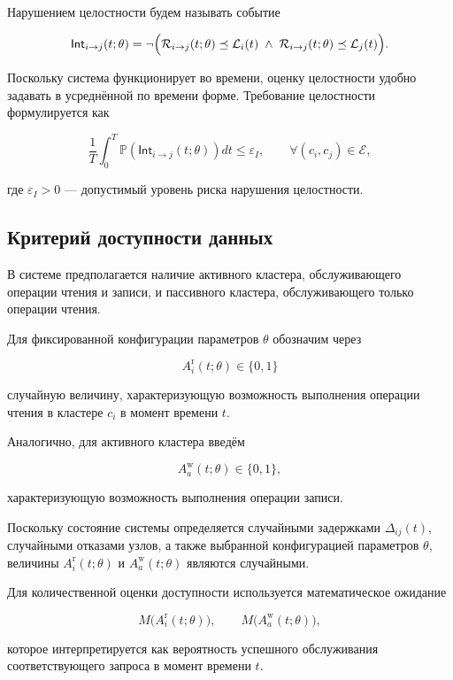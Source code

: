 Нарушением целостности будем называть событие

\[
\mathsf{Int}_{i\to j}(t;\theta)
=
\neg\Bigl(
\mathcal{R}_{i\to j}(t;\theta) \preceq \mathcal{L}_i(t)
\;\wedge\;
\mathcal{R}_{i\to j}(t;\theta) \preceq \mathcal{L}_j(t)
\Bigr).
\]

Поскольку система функционирует во времени,
оценку целостности удобно задавать в усреднённой по времени форме.
Требование целостности формулируется как

\begin{equation}
\frac{1}{T}
\int_{0}^{T}
\mathbb{P}\!\left(\mathsf{Int}_{i\to j}(t;\theta)\right)dt
\le
\varepsilon_I,
\qquad
\forall (c_i,c_j)\in\mathcal{E},
\label{eq:integrity_final}
\end{equation}

где $\varepsilon_I>0$ — допустимый уровень риска нарушения целостности.

\subsection{Критерий доступности данных}

В системе предполагается наличие активного кластера,
обслуживающего операции чтения и записи,
и пассивного кластера,
обслуживающего только операции чтения.

Для фиксированной конфигурации параметров $\theta$
обозначим через

\[
A_i^{\mathrm{r}}(t;\theta) \in \{0,1\}
\]

случайную величину, характеризующую возможность выполнения операции чтения
в кластере $c_i$ в момент времени $t$.

Аналогично, для активного кластера введём

\[
A_a^{\mathrm{w}}(t;\theta) \in \{0,1\},
\]

характеризующую возможность выполнения операции записи.

Поскольку состояние системы определяется
случайными задержками $\Delta_{ij}(t)$,
случайными отказами узлов,
а также выбранной конфигурацией параметров $\theta$,
величины
$A_i^{\mathrm{r}}(t;\theta)$
и
$A_a^{\mathrm{w}}(t;\theta)$
являются случайными.

Для количественной оценки доступности используется математическое ожидание

\[
M\big(A_i^{\mathrm{r}}(t;\theta)\big),
\qquad
M\big(A_a^{\mathrm{w}}(t;\theta)\big),
\]

которое интерпретируется как вероятность успешного обслуживания
соответствующего запроса в момент времени $t$.

